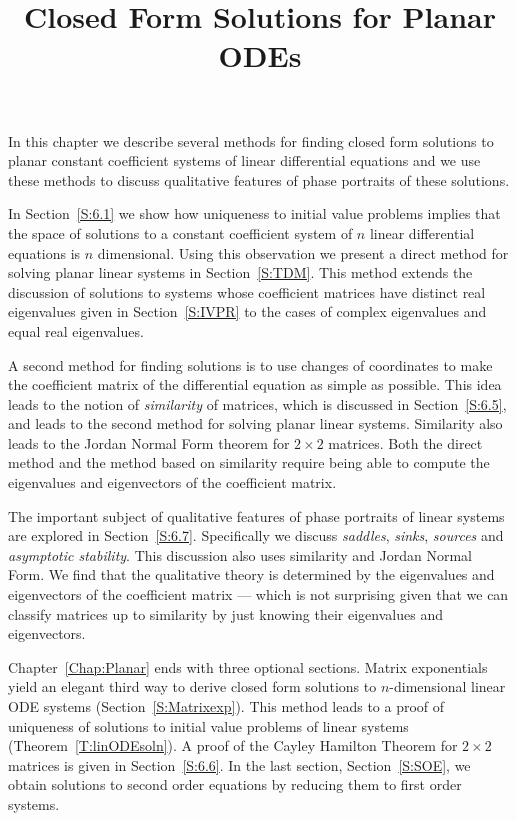 \documentclass{ximera}
\title{Closed Form Solutions for Planar ODEs}
\begin{document}
\begin{abstract}
\end{abstract}
\maketitle


\normalsize

In this chapter we describe several methods for finding closed form
solutions to planar constant coefficient systems of linear differential
equations and we use these methods to discuss qualitative features 
of phase portraits of these solutions.

In Section~\ref{S:6.1} we show how uniqueness to
initial value problems implies that the space of solutions to a constant
coefficient system of $n$ linear differential equations is $n$ dimensional.
Using this observation we present a direct method for solving planar linear
systems in Section~\ref{S:TDM}.  This method extends the discussion of
solutions to systems whose coefficient matrices have distinct real
eigenvalues given in Section~\ref{S:IVPR} to the cases of complex
eigenvalues and equal real eigenvalues.

A second method for finding solutions is to use changes of coordinates to 
make the coefficient matrix of the differential equation as simple as possible.  
This idea leads to the notion of {\em similarity\/} of matrices, which is discussed 
in Section~\ref{S:6.5}, and leads to the second method for solving planar linear 
systems. Similarity also leads to the Jordan Normal Form theorem for 
$2\times 2$ matrices.
Both the direct method and the method based on similarity require 
being able to compute the eigenvalues and eigenvectors of the coefficient matrix.

The important subject of qualitative features of phase portraits of linear systems are explored in
Section~\ref{S:6.7}.  Specifically we discuss {\em saddles\/}, {\em sinks\/}, 
{\em sources\/} and {\em asymptotic stability}.  This discussion also uses similarity 
and Jordan Normal Form.  We find that the qualitative theory is determined 
by the eigenvalues and eigenvectors of the coefficient matrix --- which is not 
surprising given that we can classify matrices up to similarity by just knowing 
their eigenvalues and eigenvectors.  

Chapter~\ref{Chap:Planar} ends with three optional sections.  Matrix exponentials 
yield an elegant third way to derive closed form solutions to $n$-dimensional linear 
ODE systems (Section~\ref{S:Matrixexp}).  This method 
leads to a proof of uniqueness of solutions to initial value problems of linear systems 
(Theorem~\ref{T:linODEsoln}).  A proof of the Cayley Hamilton Theorem 
for $2\times 2$ matrices is given in Section~\ref{S:6.6}.
In the last section, Section~\ref{S:SOE}, we obtain solutions to second order 
equations by reducing them to first order systems.
\end{document}
